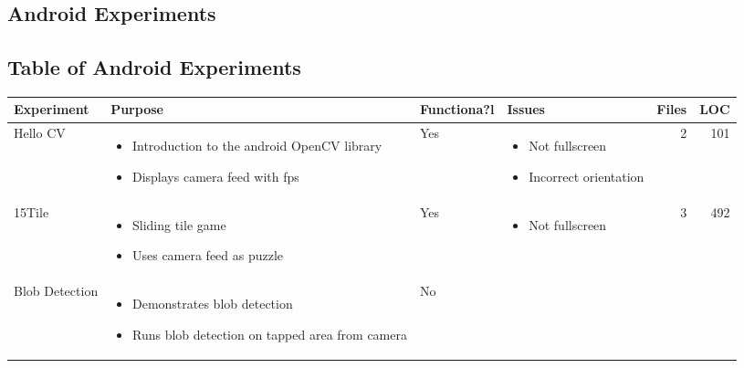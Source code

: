 \documentclass[a4paper, 12pt, hidelinks]{article}
\begin{document}
	\begin{landscape}
		\section{Android Experiments}\label{app:android_experiments}
		\subsection{Table of Android Experiments}
		\begin{table}[h!]
			\centering
			\label{tab:android_experiments}
			\begin{tabular}{|l|p{0.4\textwidth}|l|p{}|r|r|}
				\hline
				\bfseries Experiment&\bfseries Purpose&\bfseries Functiona?l&\bfseries Issues&\bfseries Files&\bfseries LOC\\
				\hline
				Hello CV&
				\begin{itemize}[noitemsep,topsep=0pt,parsep=0pt]
					\item{Introduction to the android OpenCV library}
					\item{Displays camera feed with fps}
				\end{itemize}&
				Yes&
				\begin{itemize}[noitemsep,topsep=0pt,parsep=0pt]
					\item{Not fullscreen}
					\item{Incorrect orientation}
				\end{itemize}&
				2&
				101\\
				\hline
				15Tile&
				\begin{itemize}[noitemsep,topsep=0pt,parsep=0pt]
					\item{Sliding tile game}
					\item{Uses camera feed as puzzle}
				\end{itemize}&
				Yes&
				\begin{itemize}[noitemsep,topsep=0pt,parsep=0pt]
					\item{Not fullscreen}
				\end{itemize}&
				3&
				492\\
				\hline
				Blob Detection&
				\begin{itemize}[noitemsep,topsep=0pt,parsep=0pt]
					\item{Demonstrates blob detection}
					\item{Runs blob detection on tapped area from camera}
				\end{itemize}&
				No&
				\begin{itemize}[noitemsep,topsep=0pt,parsep=0pt]

\end{itemize}
\end{tabular}
\end{table}
\end{landscape}
\end{document}
